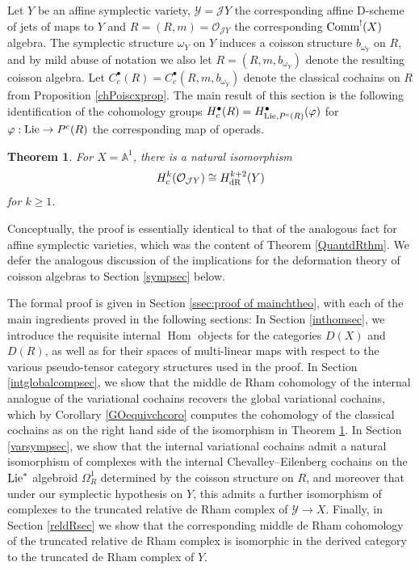 \documentclass[11pt]{amsart}
\numberwithin{equation}{section}
\newtheorem{theo}{Theorem}[section]
\theoremstyle{definition}
\newcommand{\bb}{\mathbb}
\newcommand{\mc}{\mathcal}
\DeclareMathOperator{\Hom}{Hom}
\newcommand{\dR}{{\textup{dR}}}
\newcommand{\Comm}{{\textup{Comm}}}
\newcommand{\Lie}{{\textup{Lie}}}
\newcommand{\0}{{\textbf{0}}}
\newcommand{\DD}{{D}}
\begin{document}
Let $Y$ be an affine symplectic variety, $\mc Y=\mc JY$ the corresponding affine D-scheme of jets of maps to $Y$ and $R=(R,m)=\mc O_{\mc JY}$ the corresponding $\Comm^!(X)$ algebra. The symplectic structure $\omega_Y$ on $Y$ induces a coisson structure $b_{\omega_Y}$ on $R$, and by mild abuse of notation we also let $R=(R,m,b_{\omega_Y})$ denote the resulting coisson algebra. Let $C^\bullet_c(R)=C^\bullet_c(R,m,b_{\omega_Y})$ denote the classical cochains on $R$ from Proposition \ref{chPoiscxprop}. The main result of this section is the following identification of the cohomology groups $H^\bullet_c(R)=H_{\Lie,P^c(R)}^{\bullet}(\varphi)$ for $\varphi:\Lie\to P^c(R)$ the corresponding map of operads.

\begin{theo}\label{mainchtheo} For $X=\bb A^1$, there is a natural isomorphism
	\[  H_{c}^{k}(\mc O_{\mc JY}) \cong  H^{k+2}_\dR(Y)  \]
	for $k\geq 1$.
\end{theo}

Conceptually, the proof is essentially identical to that of the analogous fact for affine symplectic varieties, which was the content of Theorem \ref{QuantdRthm}. We defer the analogous discussion of the implications for the deformation theory of coisson algebras to Section \ref{sympsec} below.

The formal proof is given in Section \ref{ssec:proof of mainchtheo}, with each of the main ingredients proved in the following sections: In Section \ref{inthomsec}, we introduce the requisite internal $\Hom$ objects for the categories $\DD(X)$ and $\DD(R)$, as well as for their spaces of multi-linear maps with respect to the various pseudo-tensor category structures used in the proof. In Section \ref{intglobalcompsec}, we show that the middle de Rham cohomology of the internal analogue of the variational cochains recovers the global variational cochains, which by Corollary \ref{GOequivchcoro} computes the cohomology of the classical cochains as on the right hand side of the isomorphism in Theorem \ref{mainchtheo}. In Section \ref{varsympsec}, we show that the internal variational cochains admit a natural isomorphism of complexes with the internal Chevalley--Eilenberg cochains on the $\Lie^*$ algebroid $\Omega^1_R$ determined by the coisson structure on $R$, and moreover that under our symplectic hypothesis on $Y$, this admits a further isomorphism of complexes to the truncated relative de Rham complex of $\mc Y \to X$. Finally, in Section \ref{reldRsec} we show that the corresponding middle de Rham cohomology of the truncated relative de Rham complex is isomorphic in the derived category to the truncated de Rham complex of $Y$.
\end{document}
